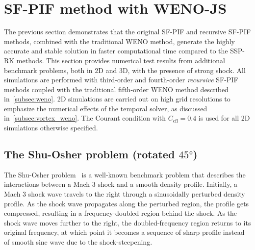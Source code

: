 \section{SF-PIF method with WENO-JS}\label{sec:result_wenojs}

The previous section demonstrates that the original SF-PIF and recursive SF-PIF methods,
combined with the traditional WENO method,
generate the highly accurate and stable solution in faster computational time
compared to the SSP-RK methods.
This section provides numerical test results from additional benchmark problems,
both in 2D and 3D, with the presence of strong shock.
All simulations are performed with third-order and fourth-order \textit{recursive} SF-PIF methods
coupled with the traditional fifth-order WENO method described in~\cref{subsec:weno}.
2D simulations are carried out on high grid resolutions
to emphasize the numerical effects of the temporal solver, as discussed in~\cref{subsec:vortex_weno}.
The Courant condition with \( C_{\text{cfl}} = 0.4 \) is used for all 2D simulations
otherwise specified.

\subsection{The Shu-Osher problem (rotated \(\ang{45}\))}\label{subsec:shu45_weno}

The Shu-Osher problem~\cite{shu1989efficient} is a well-known benchmark problem
that describes the interactions between a Mach 3 shock and a smooth density profile.
Initially, a Mach 3 shock wave travels to the right through a sinusoidally perturbed
density profile. As the shock wave propagates along the perturbed region,
the profile gets compressed, resulting in a frequency-doubled region behind the shock. 
As the shock wave moves further to the right,
the doubled-frequency region returns to its original frequency, at which point
it becomes a sequence of sharp profile instead of smooth sine wave
due to the shock-steepening.

